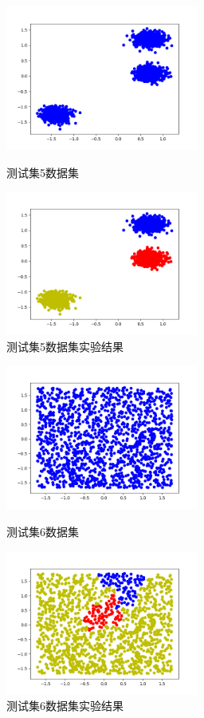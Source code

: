 \documentclass{article}
\begin{document}
   \begin{figure}[!ht]
\centering
    \begin{minipage}[c]{0.5\textwidth}
        \centering
      \includegraphics[width=2.5in]{ds5}
      \caption{测试集5数据集}\label{aa}
    \end{minipage}%
    \begin{minipage}[c]{0.5\textwidth}
        \centering
      \includegraphics[width=2.5in]{ds52}
      \caption{测试集5数据集实验结果}\label{aa}
    \end{minipage}
\end{figure}

   \begin{figure}[!ht]
\centering
    \begin{minipage}[c]{0.5\textwidth}
        \centering
      \includegraphics[width=2.5in]{ds6}
      \caption{测试集6数据集}\label{aa}
    \end{minipage}%
    \begin{minipage}[c]{0.5\textwidth}
        \centering
      \includegraphics[width=2.5in]{ds62}
      \caption{测试集6数据集实验结果}\label{aa}
    \end{minipage}
\end{figure}
\end{document}
